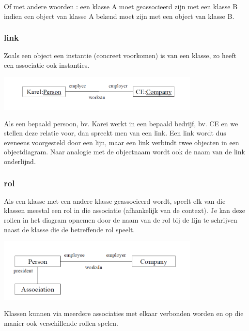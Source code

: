 Of met andere woorden : een klasse A moet geassocieerd zijn met een klasse B indien een object van klasse A bekend moet zijn met een object van klasse B.

\subsubsection{link}

Zoals een object een instantie (concreet voorkomen) is van een klasse, zo heeft een associatie ook instanties.


\begin{center}
\includegraphics[width=4in]{img/link1}%
\end{center}

Als een bepaald persoon, bv. Karei werkt in een bepaald bedrijf, bv. CE en we stellen deze relatie voor, dan spreekt men van een link. Een link wordt dus eveneens voorgesteld door een lijn, maar een link verbindt twee objecten in een objectdiagram.
Naar analogie met de objectnaam wordt ook de naam van de link onderlijnd.
\newpage
\subsubsection{rol}

Als een klasse met een andere klasse geassocieerd wordt, speelt elk van die klassen meestal een rol in die associatie (afhankelijk van de context). Je kan deze rollen in het diagram opnemen door de naam van de rol bij de lijn te schrijven naast de klasse die de betreffende rol speelt.


\begin{center}
\includegraphics[width=4in]{img/rol1}%
\end{center}

Klassen kunnen via meerdere associaties met elkaar verbonden worden en op die manier ook verschillende rollen spelen.

